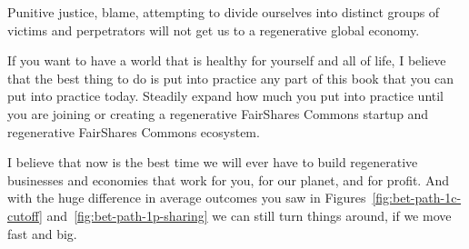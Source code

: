 Punitive justice, blame, attempting to divide ourselves into distinct groups of victims and perpetrators will not get us to a regenerative global economy.


If you want to have a world that is healthy for yourself and all of life, I believe that the best thing to do is put into practice any part of this book that you can put into practice today. Steadily expand how much you put into practice until you are joining or creating a regenerative FairShares Commons startup and regenerative FairShares Commons ecosystem.


I believe that now is the best time we will ever have to build regenerative businesses and economies that work for you, for our planet, and for profit. And with the huge difference in average outcomes you saw in Figures~\ref{fig:bet-path-1c-cutoff} and~\ref{fig:bet-path-1p-sharing} we can still turn things around, if we move fast and big.